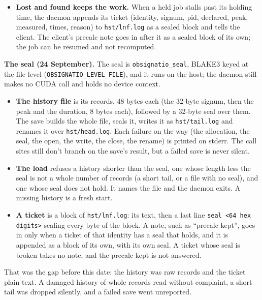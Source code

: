 \begin{itemize}
\item \textbf{Lost and found keeps the work.} When a held job stalls past its holding time, the daemon appends its ticket (identity, signum, pid, declared, peak, measured, times, reason) to \texttt{hst/\allowbreak{}lnf.\allowbreak{}log} as a sealed block and tells the client. The client's precalc note goes in after it as a sealed block of its own; the job can be resumed and not recomputed.
\end{itemize}

\textbf{The seal (24 September).} The seal is \texttt{obsignatio\_\allowbreak{}seal}, BLAKE3 keyed at the file level (\texttt{OBSIGNATIO\_\allowbreak{}LEVEL\_\allowbreak{}FILE}), and it runs on the host; the daemon still makes no CUDA call and holds no device context.

\begin{itemize}
\item \textbf{The history file} is its records, 48 bytes each (the 32-byte signum, then the peak and the duration, 8 bytes each), followed by a 32-byte seal over them. The save builds the whole file, seals it, writes it as \texttt{hst/\allowbreak{}tail.\allowbreak{}log} and renames it over \texttt{hst/\allowbreak{}head.\allowbreak{}log}. Each failure on the way (the allocation, the seal, the open, the write, the close, the rename) is printed on stderr. The call sites still don't branch on the save's result, but a failed save is never silent.
\item \textbf{The load} refuses a history shorter than the seal, one whose length less the seal is not a whole number of records (a short tail, or a file with no seal), and one whose seal does not hold. It names the file and the daemon exits. A missing history is a fresh start.
\item \textbf{A ticket} is a block of \texttt{hst/\allowbreak{}lnf.\allowbreak{}log}: its text, then a last line \texttt{seal <64 hex digits>} sealing every byte of the block. A note, such as “precalc kept”, goes in only when a ticket of that identity has a seal that holds, and it is appended as a block of its own, with its own seal. A ticket whose seal is broken takes no note, and the precalc kept is not answered.
\end{itemize}

That was the gap before this date: the history was raw records and the ticket plain text. A damaged history of whole records read without complaint, a short tail was dropped silently, and a failed save went unreported.

